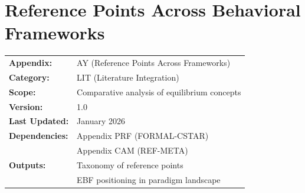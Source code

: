 \section{Reference Points Across Behavioral Frameworks}
\label{app:lit-paradigms}



\begin{tcolorbox}[colback=blue!5!white, colframe=blue!75!black,
    title=\textbf{Appendix PAP3: LIT-PARADIGMS}]

\begin{tabular}{@{}ll@{}}
\textbf{Appendix:} & AY (Reference Points Across Frameworks) \\
\textbf{Category:} & LIT (Literature Integration) \\
\textbf{Scope:} & Comparative analysis of equilibrium concepts \\
\textbf{Version:} & 1.0 \\
\textbf{Last Updated:} & January 2026 \\
\textbf{Dependencies:} & Appendix PRF (FORMAL-CSTAR) \\
                       & Appendix CAM (REF-META) \\
\textbf{Outputs:} & Taxonomy of reference points \\
                  & EBF positioning in paradigm landscape \\
\end{tabular}

\end{tcolorbox}


